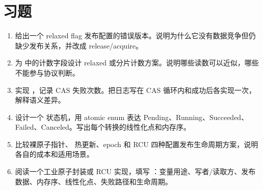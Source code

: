 \section{习题}

\begin{exercisebox}
\begin{enumerate}
  \item 给出一个 relaxed  flag 发布配置的错误版本。说明为什么它没有数据竞争但仍缺少发布关系，并改成 release/acquire。
  \item 为  中的计数字段设计 relaxed 或分片计数方案。说明哪些读数可以近似，哪些不能参与协议判断。
  \item 实现 ，记录 CAS 失败次数。把日志写在 CAS 循环内和成功后各实现一次，解释语义差异。
  \item 设计一个  状态机，用 atomic enum 表达 Pending、Running、Succeeded、Failed、Canceled。写出每个转换的线性化点和内存序。
  \item 比较裸原子指针、 热更新、epoch 和 RCU 四种配置发布生命周期方案，说明各自的成本和适用场景。
  \item 阅读一个工业原子封装或 RCU 实现，填写 ：变量用途、写者/读取方、发布数据、内存序、线性化点、失败路径和生命周期。
\end{enumerate}
\end{exercisebox}
